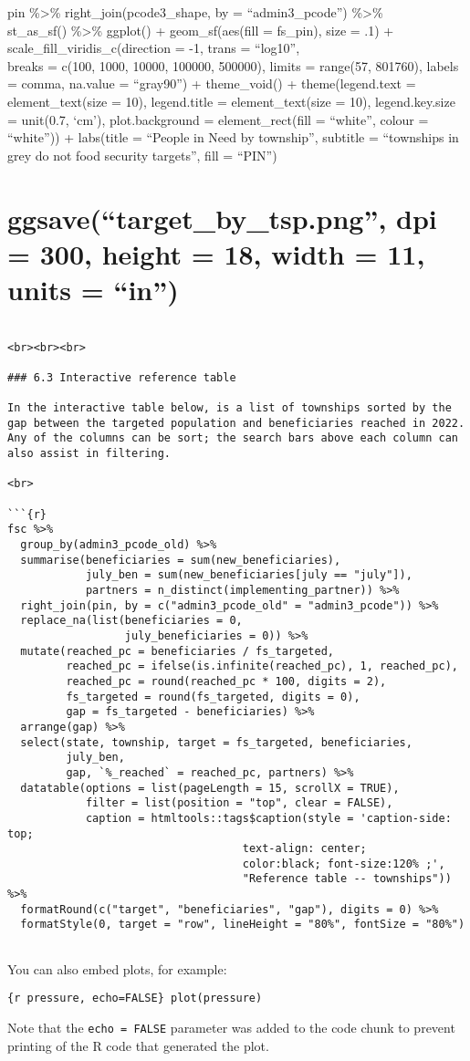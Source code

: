 \documentclass[
]{article}
\begin{document}
pin \%\textgreater\% right\_join(pcode3\_shape, by = ``admin3\_pcode'')
\%\textgreater\%\\
st\_as\_sf() \%\textgreater\% ggplot() + geom\_sf(aes(fill = fs\_pin),
size = .1) + scale\_fill\_viridis\_c(direction = -1, trans =
``log10'',\\
breaks = c(100, 1000, 10000, 100000, 500000), limits = range(57,
801760), labels = comma, na.value = ``gray90'') + theme\_void() +
theme(legend.text = element\_text(size = 10), legend.title =
element\_text(size = 10), legend.key.size = unit(0.7, `cm'),
plot.background = element\_rect(fill = ``white'', colour = ``white'')) +
labs(title = ``People in Need by township'', subtitle = ``townships in
grey do not food security targets'', fill = ``PIN'')

\hypertarget{ggsavetarget_by_tsp.png-dpi-300-height-18-width-11-units-in}{%
\section{ggsave(``target\_by\_tsp.png'', dpi = 300, height = 18, width =
11, units =
``in'')}\label{ggsavetarget_by_tsp.png-dpi-300-height-18-width-11-units-in}}

\begin{verbatim}

<br><br><br>

### 6.3 Interactive reference table

In the interactive table below, is a list of townships sorted by the gap between the targeted population and beneficiaries reached in 2022. Any of the columns can be sort; the search bars above each column can also assist in filtering.

<br>

```{r}
fsc %>% 
  group_by(admin3_pcode_old) %>% 
  summarise(beneficiaries = sum(new_beneficiaries),
            july_ben = sum(new_beneficiaries[july == "july"]), 
            partners = n_distinct(implementing_partner)) %>% 
  right_join(pin, by = c("admin3_pcode_old" = "admin3_pcode")) %>% 
  replace_na(list(beneficiaries = 0, 
                  july_beneficiaries = 0)) %>%
  mutate(reached_pc = beneficiaries / fs_targeted,
         reached_pc = ifelse(is.infinite(reached_pc), 1, reached_pc),
         reached_pc = round(reached_pc * 100, digits = 2), 
         fs_targeted = round(fs_targeted, digits = 0), 
         gap = fs_targeted - beneficiaries) %>% 
  arrange(gap) %>% 
  select(state, township, target = fs_targeted, beneficiaries,
         july_ben, 
         gap, `%_reached` = reached_pc, partners) %>% 
  datatable(options = list(pageLength = 15, scrollX = TRUE), 
            filter = list(position = "top", clear = FALSE),
            caption = htmltools::tags$caption(style = 'caption-side: top; 
                                    text-align: center; 
                                    color:black; font-size:120% ;',
                                    "Reference table -- townships")) %>% 
  formatRound(c("target", "beneficiaries", "gap"), digits = 0) %>% 
  formatStyle(0, target = "row", lineHeight = "80%", fontSize = "80%")


\end{verbatim}

You can also embed plots, for example:

\texttt{\{r\ pressure,\ echo=FALSE\}\ plot(pressure)}

Note that the \texttt{echo\ =\ FALSE} parameter was added to the code
chunk to prevent printing of the R code that generated the plot.
\end{document}
